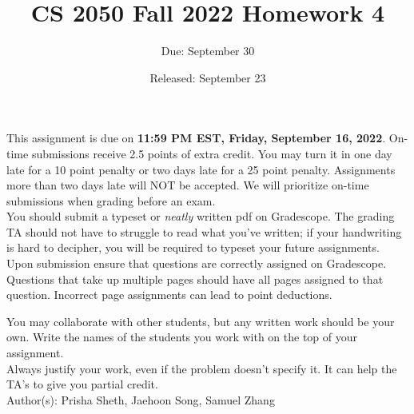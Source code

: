 \documentclass{article}
\title{CS 2050 Fall 2022 Homework 4}
\author{Due: September 30}
\date{Released: September 23}
\begin{document}
\maketitle

This assignment is due on \textbf{11:59 PM EST, Friday, September 16, 2022}.  On-time submissions receive 2.5 points of extra credit. You may turn it in one day late for a 10 point penalty or two days late for a 25 point penalty. Assignments more than two days late will NOT be accepted.  We will prioritize on-time submissions when grading before an exam. \\ 

You should submit a typeset or \emph{neatly} written pdf on Gradescope.  The grading TA should not have to struggle to read what you've written; if your handwriting is hard to decipher, you will be required to typeset your future assignments.\\ 

Upon submission ensure that questions are correctly assigned on Gradescope. Questions that take up multiple pages should have all pages assigned to that question. Incorrect page assignments can lead to point deductions.

You may collaborate with other students, but any written work should be your own. Write the names of the students you work with on the top of your assignment.\\

Always justify your work, even if the problem doesn't specify it. It can help the TA's to give you partial credit.
\\

Author(s): Prisha Sheth, Jaehoon Song, Samuel Zhang

\clearpage
\end{document}
